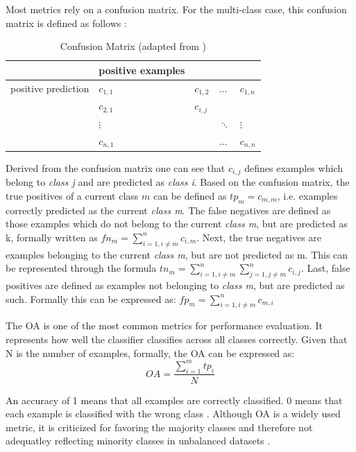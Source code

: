 \documentclass[12pt, a4paper, titlepage]{article}
\begin{document}
Most metrics rely on a confusion matrix. For the multi-class case, this confusion matrix is defined as follows \citep{Kautz2017}: 
\begin{table}[hb!]
  \center
  \begin{tabular}{lllll}
  \hline
            & positive examples      &           &             &             \\ \hline
  positive prediction  & $c_{1,1}$ & $c_{1,2}$ & $\dots$     & $c_{1,n}$   \\
            & $c_{2,1}$ & $c_{i,j}$ &             &             \\
            &  $\vdots$         &           & $\ddots$ &   $\vdots$\\
            & $c_{n,1}$ &           & $\dots$     & $c_{n,n}$   \\ \hline
  \end{tabular}
  \caption[Confusion Matrix]{\label{tab: T1} Confusion Matrix (adapted from \citep[113]{Kautz2017})}
  \end{table}

Derived from the confusion matrix one can see that $c_{i, j}$ defines examples which belong to  \textit{class j} and are predicted as \textit{class i}. Based on the confusion matrix, the true positives of a current class $m$ can be defined as $tp_{m} = c_{m, m}$, i.e. examples correctly predicted as the current  \textit{class m}. The false negatives are defined as those examples which do not belong to the current \textit{class m}, but are predicted as k, formally written as $fn_{m} = \sum_{i=1, i \neq m}^n c_{i, m}$. Next, the true negatives are examples belonging to the current  \textit{class m}, but are not predicted as m. This can be represented through the formula $tn_{m} = \sum_{i=1, i\neq m}^n \sum_{j=1, j \neq m}^n c_{i,j}$. Last, false positives are defined as examples not belonging to  \textit{class m}, but are predicted as such. Formally this can be expressed as: $fp_{m} =  \sum_{i=1, i \neq m}^n c_{m, i}$ \citep{Kautz2017}

The \ac{OA} is one of the most common metrics for performance evaluation. It represents how well the classifier classifies across all classes correctly. Given that N is the number of examples, formally, the \ac{OA} can be expressed as: 
\[OA = \frac{\sum_{i=1}^m tp_i}{N} \]

An accuracy of 1 means that all examples are correctly classified. 0 means that each example is classified with the wrong class \citep{Berthold2020}. Although \ac{OA} is a widely used metric, it is criticized for favoring the majority classes and therefore not adequatley reflecting minority classes in unbalanced datasets \citep{Berthold2020, Fatourechi2008}.
\end{document}
